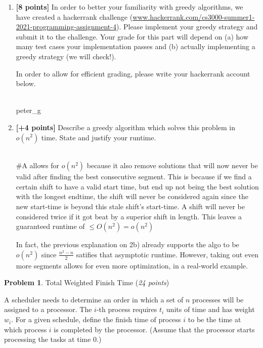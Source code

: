 \documentclass[11pt]{article}
\theoremstyle{definition}
\theoremstyle{theorem}
\newtheorem{prob}{Problem}
\newcommand{\solution}{\medskip\noindent{\color{DarkBlue}\textbf{Solution:}}}
\begin{document}
\begin{enumerate}[label=(\alph*)]
\item \textbf{[8 points]} In order to better your familiarity with greedy algorithms, we have created a hackerrank challenge (\href{www.hackerrank.com/cs3000-summer1-2021-programming-assignment-4}{www.hackerrank.com/cs3000-summer1-2021-programming-assignment-4}). Please implement your greedy strategy and submit it to the challenge. Your grade for this part will depend on (a) how many test cases your implementation passes and (b) actually implementing a greedy strategy (we will check!).

In order to allow for efficient grading, please write your hackerrank account below.

\solution \\
peter\_g

\item \textbf{[+4 points]}  Describe a greedy algorithm which solves this problem in $o(n^2)$ time. State and justify your runtime.

\solution \\

\#A allows for $o(n^2)$ because it also remove solutions that will now never be valid after finding the best consecutive segment.
This is because if we find a certain shift to have a valid start time, but end up not being the best solution with the longest endtime,
 the shift will never be considered again since the new start-time is beyond this stale shift's start-time. 
 A shift will never be considered twice if it got beat by a superior shift in length. This leaves a guaranteed runtime of $ \le O(n^2) = o(n^2)$

In fact, the previous explanation on 2b) already supports the algo to be $o(n^2)$ since $\frac{n^2-n}{2}$ satifies that asymptotic runtime.
However, taking out even more segments allows for even more optimization, in a real-world example.

\end{enumerate}

\newpage

\begin{prob} Total Weighted Finish Time (\emph{24 points})\end{prob}

A scheduler needs to determine an order in which a set of $n$ processes will be assigned to a processor. The $i$-th process requires $t_i$ units of time and has weight $w_i$. For a given schedule, deﬁne the ﬁnish time of process $i$ to be the time at which process $i$ is completed by the processor. (Assume that the processor starts processing the tasks at time 0.)
\end{document}
